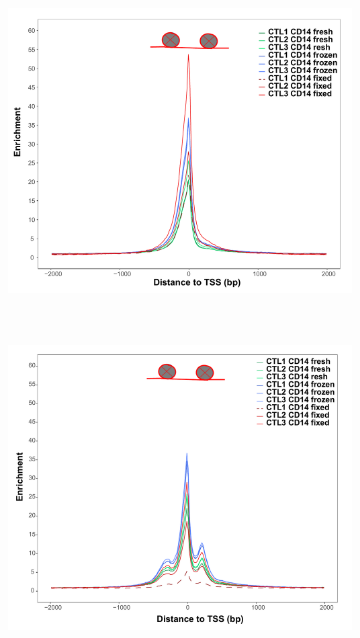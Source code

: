 \begin{figure}[H]
\centering
\begin{subfigure}[b]{0.45\textwidth}
\centering 
\includegraphics[width=\textwidth]{./Results1/pdfs/Core_ATAC_CD14_fresh_frozen_fixed_internucleosome_TSS}
\caption{}
\end{subfigure}
~
\begin{subfigure}[b]{0.45\textwidth}
\centering 
\includegraphics[width=\textwidth]{./Results1/pdfs/Core_ATAC_CD14_fresh_frozen_fixed_dinucleosome_TSS}
\caption{}
\end{subfigure}

\end{figure}
